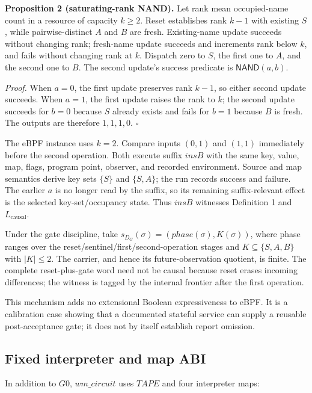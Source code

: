 \documentclass[conference]{IEEEtran}
\begin{document}
\medskip
\noindent\textbf{Proposition 2 (saturating-rank NAND).}
Let rank mean occupied-name count in a resource of capacity $k\ge2$. Reset establishes rank $k-1$ with existing $S$, while pairwise-distinct $A$ and $B$ are fresh. Existing-name update succeeds without changing rank; fresh-name update succeeds and increments rank below $k$, and fails without changing rank at $k$. Dispatch zero to $S$, the first one to $A$, and the second one to $B$. The second update's success predicate is $\mathsf{NAND}(a,b)$.

\emph{Proof.} When $a=0$, the first update preserves rank $k-1$, so either second update succeeds. When $a=1$, the first update raises the rank to $k$; the second update succeeds for $b=0$ because $S$ already exists and fails for $b=1$ because $B$ is fresh. The outputs are therefore $1,1,1,0$. \hfill$\square$

The eBPF instance uses $k=2$. Compare inputs $(0,1)$ and $(1,1)$ immediately before the second operation. Both execute suffix $\mathit{insB}$ with the same key, value, map, flags, program point, observer, and recorded environment. Source and map semantics derive key sets $\{S\}$ and $\{S,A\}$; the run records success and failure. The earlier $a$ is no longer read by the suffix, so its remaining suffix-relevant effect is the selected key-set/occupancy state. Thus $\mathit{insB}$ witnesses Definition 1 and $L_{\mathrm{causal}}$.

Under the gate discipline, take $s_{D_G}(\sigma)=(\mathit{phase}(\sigma),K(\sigma))$, where phase ranges over the reset/sentinel/first/second-operation stages and $K\subseteq\{S,A,B\}$ with $|K|\le2$. The carrier, and hence its future-observation quotient, is finite. The complete reset-plus-gate word need not be causal because reset erases incoming differences; the witness is tagged by the internal frontier after the first operation.

This mechanism adds no extensional Boolean expressiveness to eBPF. It is a calibration case showing that a documented stateful service can supply a reusable post-acceptance gate; it does not by itself establish report omission.

\subsection{Fixed interpreter and map ABI}

In addition to $G0$, $\mathit{wm\_circuit}$ uses $\mathit{TAPE}$ and four interpreter maps:
\end{document}
